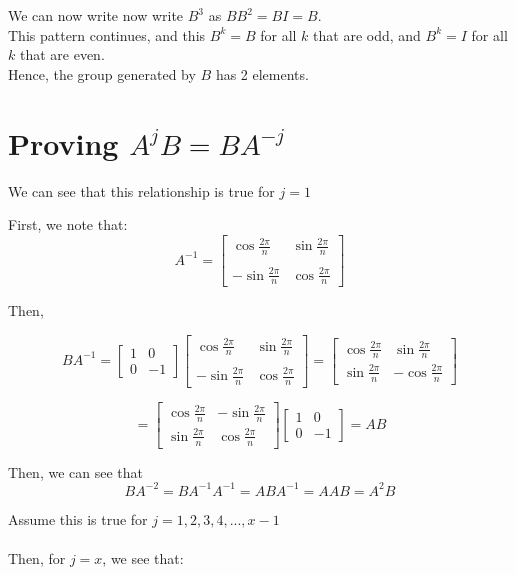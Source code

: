 \documentclass[12pt]{article}
\begin{document}
	We can now write now write $B^3$ as $BB^2 = BI = B$.
	\\ This pattern continues, and this $B^k = B$ for all $k$ that are odd, and $B^k = I$ for all $k$ that are even. 
	\\
	Hence, the group generated by $B$ has 2 elements.

	\section*{Proving $A^jB = BA^{-j}$}

	We can see that this relationship is true for $j=1$

	First, we note that: 
	\[
		A^{-1} = 
		\begin{bmatrix}
			\cos\frac{2\pi}{n} & \sin\frac{2\pi}{n} \\
			\\
			-\sin\frac{2\pi}{n} & \cos\frac{2\pi}{n}
		\end{bmatrix}
	\]

	Then, 

	\[
		BA^{-1} = 
		\begin{bmatrix}
			1 & 0 \\
			0 & -1
		\end{bmatrix}
		\begin{bmatrix}
			\cos\frac{2\pi}{n} & \sin\frac{2\pi}{n} \\
			\\
			-\sin\frac{2\pi}{n} & \cos\frac{2\pi}{n}
		\end{bmatrix}
		= 
		\begin{bmatrix}
			\cos\frac{2\pi}{n} & \sin\frac{2\pi}{n} \\
			\sin\frac{2\pi}{n} & -\cos\frac{2\pi}{n}
		\end{bmatrix}
	\]

	\[
		= 
		\begin{bmatrix}
			\cos\frac{2\pi}{n} & -\sin\frac{2\pi}{n} \\
			\sin\frac{2\pi}{n} &  \cos\frac{2\pi}{n}
			\end{bmatrix}
			\begin{bmatrix}
				1 & 0 \\
				0 & -1
			\end{bmatrix}
			=
			AB
		\]

Then, we can see that 
\[
	BA^{-2} = BA^{-1}A^{-1} = ABA^{-1} = AAB = A^2B
\]

Assume this is true for $j = 1,2,3,4,...,x-1$ \\
\\
Then, for $j=x$, we see that:
\end{document}
